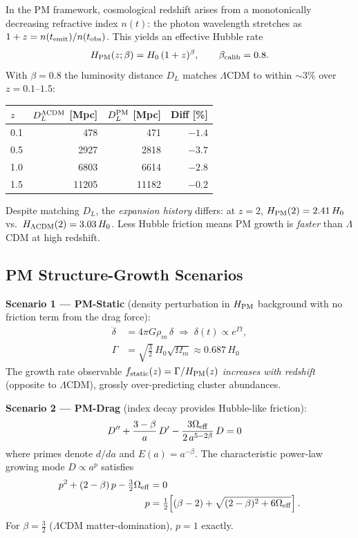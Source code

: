 \documentclass[10pt,twocolumn]{article}
\begin{document}
In the PM framework, cosmological redshift arises from a monotonically
decreasing refractive index $n(t)$: the photon wavelength stretches as
$1+z = n(t_{\rm emit})/n(t_{\rm obs})$.  This yields an effective Hubble rate
\[
  H_{\rm PM}(z;\beta) = H_0\,(1+z)^{\beta},
  \qquad \beta_{\rm calib} = 0.8.
\]
With $\beta=0.8$ the luminosity distance $D_L$ matches $\Lambda$CDM to within
$\sim3\%$ over $z=0.1$--$1.5$:
\begin{center}
\begin{tabular}{@{}lrrr@{}}
\toprule
$z$ & $D_L^{\Lambda\rm CDM}$ [Mpc] & $D_L^{\rm PM}$ [Mpc] & Diff [\%] \\
\midrule
0.1 &   478 &   471 & $-1.4$ \\
0.5 &  2927 &  2818 & $-3.7$ \\
1.0 &  6803 &  6614 & $-2.8$ \\
1.5 & 11205 & 11182 & $-0.2$ \\
\bottomrule
\end{tabular}
\end{center}
Despite matching $D_L$, the \emph{expansion history} differs: at $z=2$,
$H_{\rm PM}(2)=2.41\,H_0$ vs.\ $H_{\Lambda\rm CDM}(2)=3.03\,H_0$.
Less Hubble friction means PM growth is \emph{faster} than $\Lambda$CDM
at high redshift.

\subsection*{PM Structure-Growth Scenarios}

\textbf{Scenario 1 --- PM-Static} (density perturbation in
$H_{\rm PM}$ background with no friction term from the drag force):
\begin{align*}
  \ddot\delta &= 4\pi G\rho_m\,\delta
  \;\Longrightarrow\; \delta(t)\propto e^{\Gamma t}, \\
  \Gamma &= \sqrt{\tfrac{3}{2}}\,H_0\sqrt{\Omega_m}
  \approx 0.687\,H_0
\end{align*}
The growth rate observable $f_{\rm static}(z) = \Gamma / H_{\rm PM}(z)$
\emph{increases with redshift} (opposite to $\Lambda$CDM), grossly over-predicting
cluster abundances.

\textbf{Scenario 2 --- PM-Drag} (index decay provides Hubble-like friction):
\begin{align*}
  D'' &+ \frac{3-\beta}{a}\,D' - \frac{3\Omega_{\rm eff}}{2\,a^{5-2\beta}}\,D = 0
\end{align*}
where primes denote $d/da$ and $E(a)=a^{-\beta}$.  The characteristic
power-law growing mode $D\propto a^p$ satisfies
\begin{align*}
  p^2 + (2-\beta)\,p - \tfrac{3}{2}\Omega_{\rm eff} &= 0 \\
  p &= \tfrac{1}{2}\!\left[(\beta-2)+\sqrt{(2-\beta)^2+6\Omega_{\rm eff}}\right].
\end{align*}
For $\beta=\tfrac{3}{2}$ ($\Lambda$CDM matter-domination), $p=1$ exactly.
\end{document}
